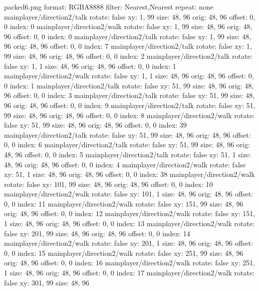 packed6.png
format: RGBA8888
filter: Nearest,Nearest
repeat: none
mainplayer/direction2/talk
  rotate: false
  xy: 1, 99
  size: 48, 96
  orig: 48, 96
  offset: 0, 0
  index: 0
mainplayer/direction2/walk
  rotate: false
  xy: 1, 99
  size: 48, 96
  orig: 48, 96
  offset: 0, 0
  index: 0
mainplayer/direction2/talk
  rotate: false
  xy: 1, 99
  size: 48, 96
  orig: 48, 96
  offset: 0, 0
  index: 7
mainplayer/direction2/talk
  rotate: false
  xy: 1, 99
  size: 48, 96
  orig: 48, 96
  offset: 0, 0
  index: 2
mainplayer/direction2/talk
  rotate: false
  xy: 1, 1
  size: 48, 96
  orig: 48, 96
  offset: 0, 0
  index: 1
mainplayer/direction2/walk
  rotate: false
  xy: 1, 1
  size: 48, 96
  orig: 48, 96
  offset: 0, 0
  index: 1
mainplayer/direction2/talk
  rotate: false
  xy: 51, 99
  size: 48, 96
  orig: 48, 96
  offset: 0, 0
  index: 3
mainplayer/direction2/talk
  rotate: false
  xy: 51, 99
  size: 48, 96
  orig: 48, 96
  offset: 0, 0
  index: 9
mainplayer/direction2/talk
  rotate: false
  xy: 51, 99
  size: 48, 96
  orig: 48, 96
  offset: 0, 0
  index: 8
mainplayer/direction2/walk
  rotate: false
  xy: 51, 99
  size: 48, 96
  orig: 48, 96
  offset: 0, 0
  index: 39
mainplayer/direction2/talk
  rotate: false
  xy: 51, 99
  size: 48, 96
  orig: 48, 96
  offset: 0, 0
  index: 6
mainplayer/direction2/talk
  rotate: false
  xy: 51, 99
  size: 48, 96
  orig: 48, 96
  offset: 0, 0
  index: 5
mainplayer/direction2/talk
  rotate: false
  xy: 51, 1
  size: 48, 96
  orig: 48, 96
  offset: 0, 0
  index: 4
mainplayer/direction2/walk
  rotate: false
  xy: 51, 1
  size: 48, 96
  orig: 48, 96
  offset: 0, 0
  index: 38
mainplayer/direction2/walk
  rotate: false
  xy: 101, 99
  size: 48, 96
  orig: 48, 96
  offset: 0, 0
  index: 10
mainplayer/direction2/walk
  rotate: false
  xy: 101, 1
  size: 48, 96
  orig: 48, 96
  offset: 0, 0
  index: 11
mainplayer/direction2/walk
  rotate: false
  xy: 151, 99
  size: 48, 96
  orig: 48, 96
  offset: 0, 0
  index: 12
mainplayer/direction2/walk
  rotate: false
  xy: 151, 1
  size: 48, 96
  orig: 48, 96
  offset: 0, 0
  index: 13
mainplayer/direction2/walk
  rotate: false
  xy: 201, 99
  size: 48, 96
  orig: 48, 96
  offset: 0, 0
  index: 14
mainplayer/direction2/walk
  rotate: false
  xy: 201, 1
  size: 48, 96
  orig: 48, 96
  offset: 0, 0
  index: 15
mainplayer/direction2/walk
  rotate: false
  xy: 251, 99
  size: 48, 96
  orig: 48, 96
  offset: 0, 0
  index: 16
mainplayer/direction2/walk
  rotate: false
  xy: 251, 1
  size: 48, 96
  orig: 48, 96
  offset: 0, 0
  index: 17
mainplayer/direction2/walk
  rotate: false
  xy: 301, 99
  size: 48, 96
